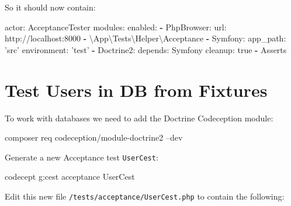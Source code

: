 \documentclass[a4paperpaper,openright]{book}
\newenvironment{Shaded}{}{}
\newcommand{\AttributeTok}[1]{\textcolor[rgb]{0.49,0.56,0.16}{#1}}
\newcommand{\CharTok}[1]{\textcolor[rgb]{0.25,0.44,0.63}{#1}}
\newcommand{\ExtensionTok}[1]{#1}
\newcommand{\FunctionTok}[1]{\textcolor[rgb]{0.02,0.16,0.49}{#1}}
\newcommand{\KeywordTok}[1]{\textcolor[rgb]{0.00,0.44,0.13}{\textbf{#1}}}
\newcommand{\NormalTok}[1]{#1}
\newcommand{\StringTok}[1]{\textcolor[rgb]{0.25,0.44,0.63}{#1}}
\begin{document}
So it should now contain:

\begin{Shaded}
\begin{Highlighting}[]
    \FunctionTok{actor:}\AttributeTok{ AcceptanceTester}
    \FunctionTok{modules:}
        \FunctionTok{enabled:}
            \KeywordTok{-} \FunctionTok{PhpBrowser:}
                \FunctionTok{url:}\AttributeTok{ http://localhost:8000}
            \KeywordTok{-}\NormalTok{ \textbackslash{}App\textbackslash{}Tests\textbackslash{}Helper\textbackslash{}Acceptance}
            \KeywordTok{-} \FunctionTok{Symfony:}
                \FunctionTok{app_path:}\AttributeTok{ }\StringTok{'src'}
                \FunctionTok{environment:}\AttributeTok{ }\StringTok{'test'}
            \KeywordTok{-} \FunctionTok{Doctrine2:}
                \FunctionTok{depends:}\AttributeTok{ Symfony}
                \FunctionTok{cleanup:}\AttributeTok{ }\CharTok{true}
            \KeywordTok{-}\NormalTok{ Asserts}
\end{Highlighting}
\end{Shaded}

\hypertarget{test-users-in-db-from-fixtures}{%
\section{Test Users in DB from
Fixtures}\label{test-users-in-db-from-fixtures}}

To work with databases we need to add the Doctrine Codeception module:

\begin{Shaded}
\begin{Highlighting}[]
    \ExtensionTok{composer}\NormalTok{ req codeception/module-doctrine2 --dev }
\end{Highlighting}
\end{Shaded}

Generate a new Acceptance test \texttt{UserCest}:

\begin{Shaded}
\begin{Highlighting}[]
\ExtensionTok{codecept}\NormalTok{ g:cest acceptance UserCest}
\end{Highlighting}
\end{Shaded}

Edit this new file \texttt{/tests/acceptance/UserCest.php} to contain
the following:
\end{document}

